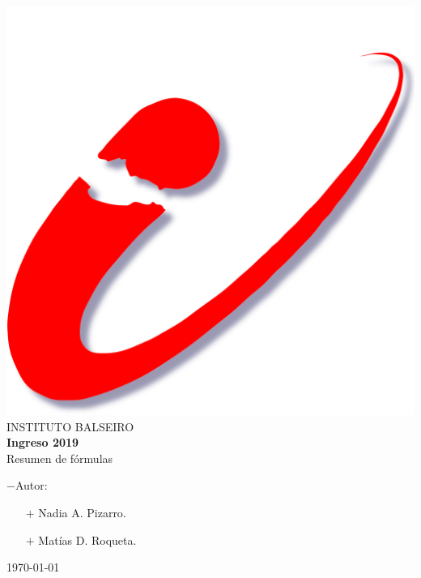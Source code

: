 \documentclass[12pt,a4paper]{article}
\date{\small{\today}}
\begin{document}
  \begin{center}


    \includegraphics[scale=0.15]{ib}
    \vspace{1cm}
    \vspace{1cm}
    \\
    \Huge{INSTITUTO BALSEIRO}
    \vspace{2cm}\\
    \huge{\textbf{Ingreso 2019}}\\
    \vspace{1cm}
    \LARGE{Resumen de fórmulas}\\
    \vspace{1cm}
    \large
    \begin{flushleft}

      $-$Autor:\\
      \begin{itemize}

        \item[$+$] Nadia A. Pizarro.
        \item[$+$] Matías D. Roqueta.

      \end{itemize}

    \end{flushleft}
    \vspace{0,5cm}

    \today
    \thispagestyle{empty}
  \end{center}
\end{document}

